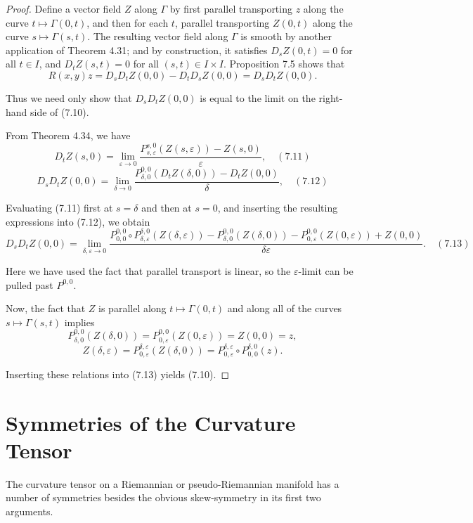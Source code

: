 \begin{proof}
Define a vector field $Z$ along $\Gamma$ by first parallel transporting $z$ along the curve $t \mapsto \Gamma(0,t)$, and then for each $t$, parallel transporting $Z(0,t)$ along the curve $s \mapsto \Gamma(s,t)$. The resulting vector field along $\Gamma$ is smooth by another application of Theorem 4.31; and by construction, it satisfies $D_s Z(0,t) = 0$ for all $t \in I$, and $D_t Z(s,t) = 0$ for all $(s,t) \in I \times I$. Proposition 7.5 shows that
\[
R(x,y)z = D_s D_t Z(0,0) - D_t D_s Z(0,0) = D_s D_t Z(0,0).
\]

Thus we need only show that $D_s D_t Z(0,0)$ is equal to the limit on the right-hand side of (7.10).

From Theorem 4.34, we have
\[
D_t Z(s,0) = \lim_{\varepsilon \to 0} \frac{P_{s,\varepsilon}^{s,0}(Z(s,\varepsilon)) - Z(s,0)}{\varepsilon}, \quad (7.11)
\]
\[
D_s D_t Z(0,0) = \lim_{\delta \to 0} \frac{P_{\delta,0}^{0,0}(D_t Z(\delta,0)) - D_t Z(0,0)}{\delta}, \quad (7.12)
\]

Evaluating (7.11) first at $s = \delta$ and then at $s = 0$, and inserting the resulting expressions into (7.12), we obtain
\[
D_s D_t Z(0,0) = \lim_{\delta,\varepsilon \to 0} \frac{P_{0,0}^{0,0} \circ P_{\delta,\varepsilon}^{\delta,0}(Z(\delta,\varepsilon)) - P_{\delta,0}^{0,0}(Z(\delta,0)) - P_{0,\varepsilon}^{0,0}(Z(0,\varepsilon)) + Z(0,0)}{\delta\varepsilon}. \quad (7.13)
\]

Here we have used the fact that parallel transport is linear, so the $\varepsilon$-limit can be pulled past $P^{0,0}$.

Now, the fact that $Z$ is parallel along $t \mapsto \Gamma(0,t)$ and along all of the curves $s \mapsto \Gamma(s,t)$ implies
\[
P_{\delta,0}^{0,0}(Z(\delta,0)) = P_{0,\varepsilon}^{0,0}(Z(0,\varepsilon)) = Z(0,0) = z,
\]
\[
Z(\delta,\varepsilon) = P_{0,\varepsilon}^{\delta,\varepsilon}(Z(\delta,0)) = P_{0,\varepsilon}^{\delta,\varepsilon} \circ P_{0,0}^{\delta,0}(z).
\]

Inserting these relations into (7.13) yields (7.10).
\end{proof}

\section{Symmetries of the Curvature Tensor}

The curvature tensor on a Riemannian or pseudo-Riemannian manifold has a number of symmetries besides the obvious skew-symmetry in its first two arguments.

